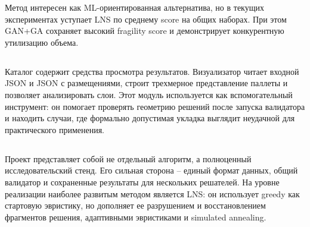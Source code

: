 Метод интересен как ML-ориентированная альтернатива, но в текущих экспериментах уступает LNS по среднему score на общих наборах. При этом GAN+GA сохраняет высокий fragility score и демонстрирует конкурентную утилизацию объема.

\subsection{}

Каталог  содержит средства просмотра результатов. Визуализатор читает входной JSON и JSON с размещениями, строит трехмерное представление паллеты и позволяет анализировать слои. Этот модуль используется как вспомогательный инструмент: он помогает проверять геометрию решений после запуска валидатора и находить случаи, где формально допустимая укладка выглядит неудачной для практического применения.

\subsection{}

Проект представляет собой не отдельный алгоритм, а полноценный исследовательский стенд. Его сильная сторона -- единый формат данных, общий валидатор и сохраненные результаты для нескольких решателей. На уровне реализации наиболее развитым методом является LNS: он использует greedy как стартовую эвристику, но дополняет ее разрушением и восстановлением фрагментов решения, адаптивными эвристиками и simulated annealing.
